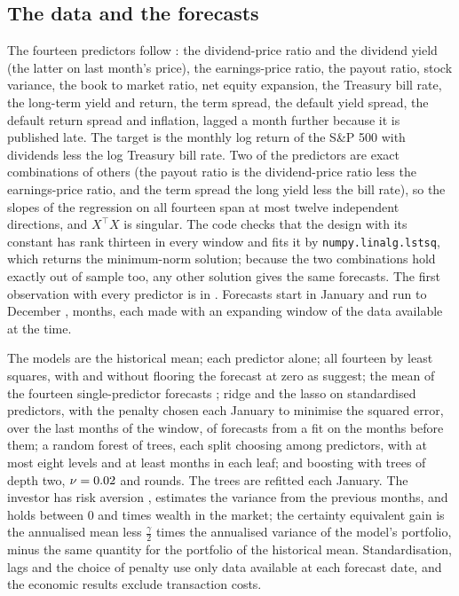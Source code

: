 \begin{chapterrefs}
\subsection{The data and the forecasts}

The fourteen predictors follow \textcite{welch2008}: the dividend-price ratio and the dividend yield (the
latter on last month's price), the earnings-price ratio, the payout ratio, stock variance, the book to
market ratio, net equity expansion, the Treasury bill rate, the long-term yield and return, the term spread,
the default yield spread, the default return spread and inflation, lagged a month further because it is
published late. The target is the monthly log return of the S\&P 500 with dividends less the log Treasury
bill rate. Two of the predictors are exact combinations of others (the payout ratio is the
dividend-price ratio less the earnings-price ratio, and the term spread the long yield less the bill rate),
so the slopes of the regression on all fourteen span at most twelve independent directions, and
$X^\top X$ is singular. The code checks that the design with its constant has rank thirteen in every
window and fits it by \texttt{numpy.linalg.lstsq}, which returns the minimum-norm solution; because the
two combinations hold exactly out of sample too, any other solution gives the same forecasts. The first observation with
every predictor is in \eqFirst. Forecasts start in January \eqOosFrom{} and run to December \eqOosTo,
\eqOosN{} months, each made with an expanding window of the data available at the time.

The models are the historical mean; each predictor alone; all fourteen by least squares, with and without
flooring the forecast at zero as \textcite{campbell2008} suggest; the mean of the fourteen single-predictor
forecasts \parencite{rapach2010}; ridge and the lasso on standardised predictors, with the penalty chosen
each January to minimise the squared error, over the last \eqValid{} months of the window, of
forecasts from a fit on the months before them; a random forest of \eqForestB{} trees, each split choosing among
\eqForestMtry{} predictors, with at most eight levels and at least \eqLeaf{} months in each leaf; and boosting with trees of
depth two, $\nu=0.02$ and \eqBoostM{} rounds. The trees are refitted each January. The investor has
risk aversion \eqGamma, estimates the variance from the previous \eqVarWin{} months, and holds between 0 and
\eqWhi{} times wealth in the market; the certainty equivalent gain is the annualised mean less $\tfrac{\gamma}{2}$ times the annualised
variance of the model's portfolio, minus the same quantity for the portfolio of the historical mean.
Standardisation, lags and the choice of penalty use only data available at each forecast date, and
the economic results exclude transaction costs.


\end{chapterrefs}
